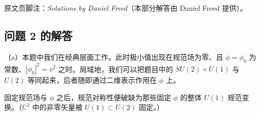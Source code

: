 

{\small\noindent 原文页脚注：\emph{Solutions by Daniel Freed}（本部分解答由 Daniel Freed 提供）。\par}

\subsection*{问题 2 的解答}

（a）本题中我们在经典层面工作。此时极小值出现在规范场为零、且 $\phi=\phi_0$ 为常数、$|\phi_0|^2=v^2$ 之时。局域地，我们可以把题目中的 $SU(2)\times U(1)$ 与 $U(2)$ 等同起来，后者随即通过二维表示作用在 $\phi$ 上。

固定规范场与 $\phi$ 之后，规范对称性便破缺为那些固定 $\phi$ 的整体 $U(1)$ 规范变换。（$\mathbb{C}^2$ 中的非零矢量被 $U(1)\subset U(2)$ 固定。）

